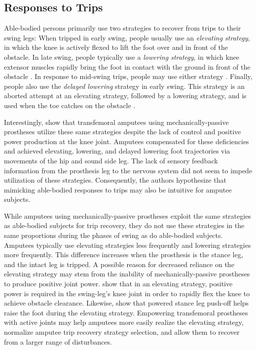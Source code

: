 \subsection{Responses to Trips}

Able-bodied persons primarily use two strategies to recover from trips to their
swing legs: When tripped in early swing, people usually use an
\emph{elevating strategy}, in which the knee is actively flexed to lift the foot
over and in front of the obstacle. In late swing, people typically use a
\emph{lowering strategy}, in which knee extensor muscles rapidly bring the foot
in contact with the ground in front of the obstacle \citep{eng1994strategies}.
In response to mid-swing trips, people may use either strategy
\citep{schillings2000muscular}. Finally, people also use the \emph{delayed
lowering} strategy in early swing. This strategy is an aborted attempt at an
elevating strategy, followed by a lowering strategy, and is used when the toe
catches on the obstacle \citep{eng1994strategies}.

Interestingly, \citet{shirota2015transfemoral} show that transfemoral amputees
using mechanically-passive prostheses utilize these same strategies despite the
lack of control and positive power production at the knee joint. Amputees
compensated for these deficiencies and achieved elevating, lowering, and delayed
lowering foot trajectories via movements of the hip and sound side leg. The lack
of sensory feedback information from the prosthesis leg to the nervous system
did not seem to impede utilization of these strategies.  Consequently, the
authors hypothesize that mimicking able-bodied responses to trips may also be
intuitive for amputee subjects. 

While amputees using mechanically-passive prostheses exploit the same strategies
as able-bodied subjects for trip recovery, they do not use these strategies in
the same proportions during the phases of swing as do able-bodied subjects.
Amputees typically use elevating strategies less frequently and lowering
strategies more frequently. This difference increases when the prosthesis is the
stance leg, and the intact leg is tripped. A possible reason for decreased
reliance on the elevating strategy may stem from the inability of
mechanically-passive prostheses to produce positive joint power.
\citet{cordero2005energy} show that in an elevating strategy, positive power is
required in the swing-leg's knee joint in order to rapidly flex the knee to
achieve obstacle clearance. Likewise, \citet{pijnappels2004contribution} show
that powered stance leg push-off helps raise the foot during the elevating
strategy. Empowering transfemoral prostheses with active joints may help
amputees more easily realize the elevating strategy, normalize amputee trip
recovery strategy selection, and allow them to recover from a larger range of
disturbances.

